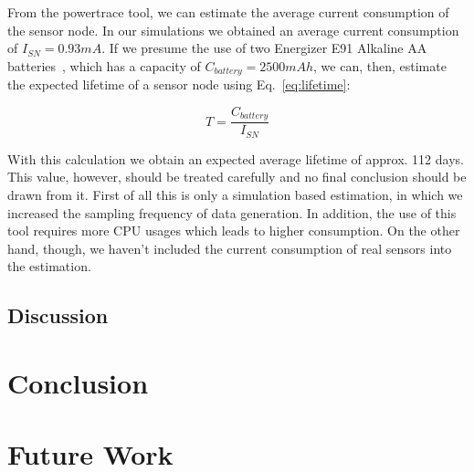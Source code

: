 \documentclass[conference]{IEEEtran}
\begin{document}
From the powertrace tool, we can estimate the average current consumption of
the sensor node.  In our simulations we obtained an average current consumption
of $I_{SN} = 0.93 mA$.  If we presume the use of two Energizer E91 Alkaline AA
batteries~\cite{EnergizerBattery}, which has a capacity of $C_{battery} = 2500
mAh$, we can, then, estimate the expected lifetime of a sensor node using
Eq.~\ref{eq:lifetime}:

\begin{equation}
\label{eq:lifetime}
T = \frac{C_{battery}}{I_{SN}}
\end{equation}

With this calculation we obtain an expected average lifetime of approx. 112 days. This value, 
however, should be treated carefully and no final conclusion should be drawn
from it. First of all this is only a simulation based estimation, in which we
increased the sampling frequency of data generation. In addition, the use of
this tool requires more CPU usages which leads to higher consumption. On the
other hand, though, we haven't included the current consumption of real sensors
into the estimation. 

\subsection{Discussion} \label{sec:discussion}

\section{Conclusion}

\section{Future Work}


%
%
\end{document}
